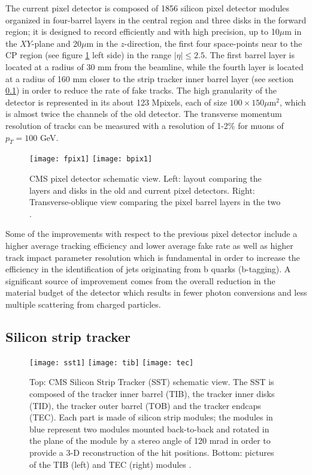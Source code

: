 \noindent  The current pixel detector is composed of 1856 silicon pixel detector modules organized in four-barrel layers in the central region and three disks in the forward region; it is designed to record efficiently and with high precision, up to 10$\mu$m in the $XY$-plane and 20$\mu$m in the $z$-direction, the first four space-points near to the CP region (see figure \ref{fig:pixel_tracker} left side) in the range $|\eta|\leq 2.5$. The first barrel layer is located at a radius of 30 mm from the beamline, while the fourth layer is located at a radius of 160 mm closer to the strip tracker inner barrel layer (see section \ref{sst}) in order to reduce the rate of fake tracks. The high granularity of the detector is represented in its about 123 Mpixels, each of size $100\times150\mu$m$^2$, which is almost twice the channels of the old detector. The transverse momentum resolution of tracks can be measured with a resolution of 1-2\% for muons of $p_T=100$ GeV. \\

\begin{figure}[h!]
  \centering
  \texttt{[image: fpix1]}
  \texttt{[image: bpix1]}
  \caption[CMS pixel detector schematic view.]{CMS pixel detector schematic view. Left: layout comparing the layers and disks in the old and current pixel detectors. Right: Transverse-oblique view comparing the pixel barrel layers in the two \cite{pix_tdr}.}
  \label{fig:pixel_tracker}
\end{figure}

\noindent Some of the improvements with respect to the previous pixel detector include a higher average tracking efficiency and lower average fake rate as well as higher track impact parameter resolution which is fundamental in order to increase the efficiency in the identification of jets originating from b quarks (b-tagging). A significant source of improvement comes from the overall reduction in the material budget of the detector which results in fewer photon conversions and less multiple scattering from charged particles.    

\subsection{Silicon strip tracker}\label{sst}
\begin{figure}[h!]
  \centering
  \texttt{[image: sst1]}
  \texttt{[image: tib]}
  \texttt{[image: tec]}
  \caption[SST Schematic view.]{Top: CMS Silicon Strip Tracker (SST) schematic view. The SST is composed of the tracker inner barrel (TIB), the tracker inner disks (TID), the tracker outer barrel (TOB) and the tracker endcaps (TEC). Each part is made of silicon strip modules; the modules in blue represent two modules mounted back-to-back and rotated in the plane of the module by a stereo angle of 120 mrad in order to provide a 3-D reconstruction of the hit positions. Bottom: pictures of the TIB (left) and TEC (right) modules \cite{sst,tib,tec}.}
  \label{fig:sst}
\end{figure}

